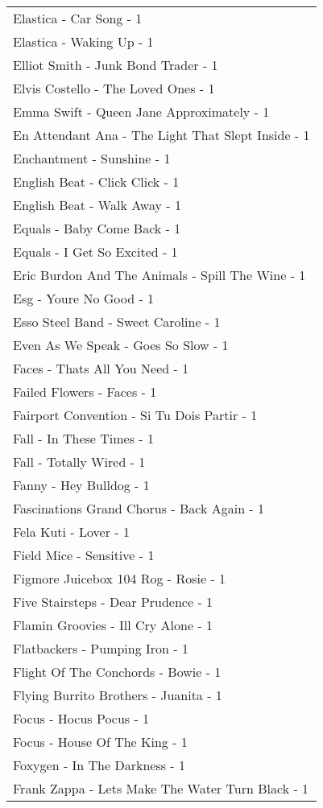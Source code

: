 \documentclass[
]{article}
\begin{document}
\begin{longtable}{l}
Elastica - Car Song - 1 \\ 
Elastica - Waking Up - 1 \\ 
Elliot Smith - Junk Bond Trader - 1 \\ 
Elvis Costello - The Loved Ones - 1 \\ 
Emma Swift - Queen Jane Approximately - 1 \\ 
En Attendant Ana - The Light That Slept Inside - 1 \\ 
Enchantment - Sunshine - 1 \\ 
English Beat - Click Click - 1 \\ 
English Beat - Walk Away - 1 \\ 
Equals - Baby Come Back - 1 \\ 
Equals - I Get So Excited - 1 \\ 
Eric Burdon And The Animals - Spill The Wine - 1 \\ 
Esg - Youre No Good - 1 \\ 
Esso Steel Band - Sweet Caroline - 1 \\ 
Even As We Speak - Goes So Slow - 1 \\ 
Faces - Thats All You Need - 1 \\ 
Failed Flowers - Faces - 1 \\ 
Fairport Convention - Si Tu Dois Partir - 1 \\ 
Fall - In These Times - 1 \\ 
Fall - Totally Wired - 1 \\ 
Fanny - Hey Bulldog - 1 \\ 
Fascinations Grand Chorus - Back Again - 1 \\ 
Fela Kuti - Lover - 1 \\ 
Field Mice - Sensitive - 1 \\ 
Figmore Juicebox 104 Rog - Rosie - 1 \\ 
Five Stairsteps - Dear Prudence - 1 \\ 
Flamin Groovies - Ill Cry Alone - 1 \\ 
Flatbackers - Pumping Iron - 1 \\ 
Flight Of The Conchords - Bowie - 1 \\ 
Flying Burrito Brothers - Juanita - 1 \\ 
Focus - Hocus Pocus - 1 \\ 
Focus - House Of The King - 1 \\ 
Foxygen - In The Darkness - 1 \\ 
Frank Zappa - Lets Make The Water Turn Black - 1 \\ 

\end{longtable}
\end{document}
